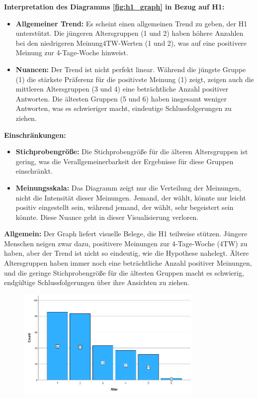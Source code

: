 \textbf{Interpretation des Diagramms \ref{fig:h1_graph} in Bezug auf H1:}
\begin{itemize}
    \item \textbf{Allgemeiner Trend:  }Es scheint einen allgemeinen Trend zu geben, der H1 unterstützt. 
    Die jüngeren Altersgruppen (1 und 2) haben höhere Anzahlen bei den niedrigeren Meinung4TW-Werten 
    (1 und 2), was auf eine positivere Meinung zur 4-Tage-Woche hinweist.
    \item \textbf{Nuancen: }Der Trend ist nicht perfekt linear. Während die jüngste Gruppe (1) die stärkste 
    Präferenz für die positivste Meinung (1) zeigt, zeigen auch die mittleren Altersgruppen (3 und 4) 
    eine beträchtliche Anzahl positiver Antworten. Die ältesten Gruppen (5 und 6) haben insgesamt weniger 
    Antworten, was es schwieriger macht, eindeutige Schlussfolgerungen zu ziehen.
\end{itemize}

\textbf{Einschränkungen:}
\begin{itemize}
    \item \textbf{Stichprobengröße:  }Die Stichprobengröße für die älteren Altersgruppen ist gering, 
    was die Verallgemeinerbarkeit der Ergebnisse für diese Gruppen einschränkt.
    \item \textbf{Meinungsskala: }Das Diagramm zeigt nur die Verteilung der Meinungen, nicht die 
    Intensität dieser Meinungen. Jemand, der  wählt, könnte nur leicht positiv eingestellt sein, 
    während jemand, der  wählt, sehr begeistert sein könnte. Diese Nuance geht in dieser 
    Visualisierung verloren.
\end{itemize}

\textbf{Allgemein:}
Der Graph liefert visuelle Belege, die H1 teilweise stützen. Jüngere Menschen neigen zwar dazu, 
positivere Meinungen zur 4-Tage-Woche (4TW) zu haben, aber der Trend ist nicht so eindeutig, wie 
die Hypothese nahelegt. Ältere Altersgruppen haben immer noch eine beträchtliche Anzahl positiver 
Meinungen, und die geringe Stichprobengröße für die ältesten Gruppen macht es schwierig, endgültige 
Schlussfolgerungen über ihre Ansichten zu ziehen.

\begin{figure}[h]
    \centering
    \includegraphics[width=0.8\textwidth]{04_Artefakte/01_Abbildungen/hypothese_1/h1_saeulen.png}
    \caption{}
    \label{fig:h1_saeulen}
\end{figure}

